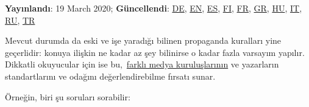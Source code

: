 \textbf{Yayınlandı}: 19 March 2020; \textbf{Güncellendi}:
\href{https://swprs.org/corona-medien-propaganda/}{DE},
\href{https://swprs.org/corona-media-propaganda/}{EN},
\href{http://piensachile.com/2020/03/corona-medios-de-comunicacion-propaganda/}{ES},
\href{https://swprs.org/koronasta-mediasta-ja-propagandasta/}{FI},
\href{https://swprs.org/sur-le-coronavirus-les-medias-et-la-propagande/}{FR},
\href{https://swprs.org/corona-media-propaganda-greek/}{GR},
\href{https://swprs.org/korona-media-propaganda/}{HU},
\href{https://swprs.org/corona-media-propaganda-it/}{IT},
\href{https://swprs.org/\%d0\%be-\%d0\%ba\%d0\%be\%d1\%80\%d0\%be\%d0\%bd\%d0\%b0\%d0\%b2\%d0\%b8\%d1\%80\%d1\%83\%d1\%81\%d0\%b5-\%d1\%81\%d0\%bc\%d0\%b8-\%d0\%b8-\%d0\%bf\%d1\%80\%d0\%be\%d0\%bf\%d0\%b0\%d0\%b3\%d0\%b0\%d0\%bd\%d0\%b4\%d0\%b5/}{RU},
\href{https://swprs.org/korona-medya-ve-propaganda-uezerine/}{TR}

Mevcut durumda da eski ve işe yaradığı bilinen propaganda kuralları yine
geçerlidir: konuya ilişkin ne kadar az şey bilinirse o kadar fazla
varsayım yapılır. Dikkatli okuyucular için ise
bu,~\href{https://swprs.org/media-navigator/}{farklı medya
kuruluşlarının} ve yazarların standartlarını ve odağını
değerlendirebilme fırsatı sunar.

Örneğin, biri şu soruları sorabilir:

